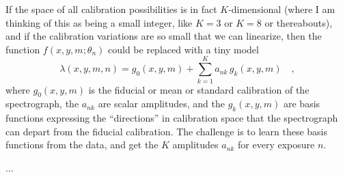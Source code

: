 \documentclass[12pt, letterpaper]{article}
\begin{document}
If the space of all calibration possibilities is in fact
$K$-dimensional (where I am thinking of this as being a small integer,
like $K=3$ or $K=8$ or thereabouts), and if the calibration variations are so
small that we can linearize, then the function $f(x,y,m;\theta_{n})$ could
be replaced with a tiny model
\begin{equation}
\lambda(x,y,m,n) = g_0(x,y,m) + \sum_{k=1}^K a_{nk}\,g_k(x,y,m)
\quad ,
\end{equation}
where
$g_0(x,y,m)$ is the fiducial or mean or standard calibration of the
spectrograph,
the $a_{nk}$ are scalar amplitudes,
and the $g_k(x,y,m)$ are basis functions expressing the ``directions''
in calibration space that the spectrograph can depart from the
fiducial calibration.
The challenge is to learn these basis functions from the data, and get
the $K$ amplitudes $a_{nk}$ for every exposure $n$.

...
\end{document}

